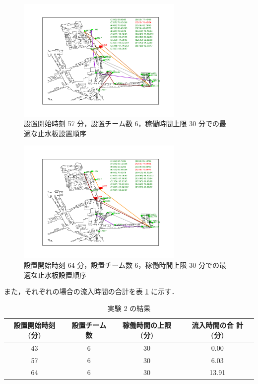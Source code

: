 \documentclass[a4paper,12pt,fleqn]{jarticle}
\begin{document}
\begin{figure}[htpb]
 \begin{center}
  \includegraphics[width=8cm,trim=100 50 100 50]{fig/57min_6team_lim30min.pdf}
  \caption{設置開始時刻 57 分，設置チーム数 6，稼働時間上限 30 分での最
  適な止水板設置順序}
  \label{fig:57min_6team_lim30min_}
 \end{center}
\end{figure}

\begin{figure}[htpb]
 \begin{center}
  \includegraphics[width=8cm,trim=100 50 100 50]{fig/64min_6team_lim30min.pdf}
  \caption{設置開始時刻 64 分，設置チーム数 6，稼働時間上限 30 分での最
  適な止水板設置順序}
  \label{fig:64min_6team_lim30min_}
 \end{center}
\end{figure}

また，それぞれの場合の流入時間の合計を表 \ref{tb:ex2} に示す．

\begin{table}[htpb]
  \begin{center}
    \caption{実験 2 の結果}
    \begin{tabular}{cccc}\hline
     設置開始時刻(分) & 設置チーム数 & 稼働時間の上限(分) & 流入時間の合
		 計 (分) \\
     \hline
     43 & 6 & 30 & 0.00 \\
     57 & 6 & 30 & 6.03 \\
     64 & 6 & 30 & 13.91 \\
     \hline
      \end{tabular}
      \label{tb:ex2}
    \end{center}
\end{table}
\end{document}
